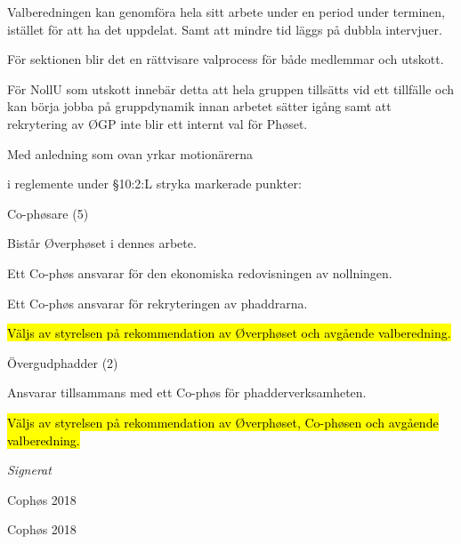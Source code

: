 \documentclass[../_main/handlingar.tex]{subfiles}
\begin{document}
\begin{dashlist}
    \item Valberedningen kan genomföra hela sitt arbete under en period under terminen, istället
    för att ha det uppdelat. Samt att mindre tid läggs på dubbla intervjuer.
    \item För sektionen blir det en rättvisare valprocess för både medlemmar och utskott.
    \item För NollU som utskott innebär detta att hela gruppen tillsätts vid ett tillfälle och kan börja
    jobba på gruppdynamik innan arbetet sätter igång samt att rekrytering av ØGP inte blir
    ett internt val för Phøset.
\end{dashlist}
\newpage
Med anledning som ovan yrkar motionärerna
\begin{attsatser}
\att i reglemente under \S10:2:L stryka markerade punkter:

\begin{emptylist}
    \item Co-phøsare (5)
        \begin{dashlist}
          \item Bistår Øverphøset i dennes arbete.
          \item Ett Co-phøs ansvarar för den ekonomiska redovisningen av nollningen.
          \item Ett Co-phøs ansvarar för rekryteringen av phaddrarna.
          \item \hl{Väljs av styrelsen på rekommendation av Øverphøset och avgående valberedning.}
        \end{dashlist}
    \item Övergudphadder (2)
        \begin{dashlist}
          \item Ansvarar tillsammans med ett Co-phøs för phadderverksamheten.
          \item \hl{Väljs av styrelsen på rekommendation av Øverphøset, Co-phøsen och avgående
          valberedning.}
        \end{dashlist}
\end{emptylist}
\changenote
\end{attsatser}
\begin{signatures}{2}
    \textit{Signerat}
    \signature{Edvard Carlsson}{Cophøs 2018}
    \signature{Sonja Kenari}{Cophøs 2018}
\end{signatures}
\end{document}
